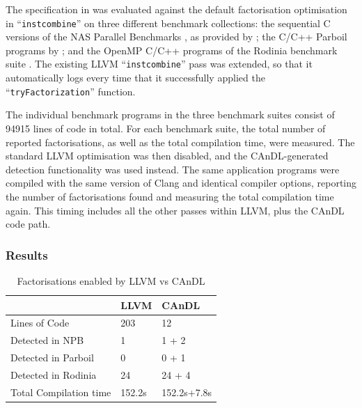     The specification in  was evaluated against the default
    factorisation optimisation in ``{\tt instcombine}'' on three different
    benchmark collections:
    the sequential C versions of the NAS Parallel Benchmarks
    \citep{Bailey1991NPB}, as provided by \citet{seo2011performance};
    the C/C++ Parboil programs by \citet{stratton2012parboil};
    and the OpenMP C/C++ programs of the Rodinia benchmark suite
    \citep{Che2009Rodinia}.
    The existing LLVM ``{\tt instcombine}'' pass was extended, so that it
    automatically logs every time that it successfully applied the
    ``{\tt tryFactorization}'' function.  

    The individual benchmark programs in the three benchmark
    suites consist of 94915 lines of code in total.
    For each benchmark suite, the total number of reported factorisations, as
    well as the total compilation time, were measured.
    The standard LLVM optimisation was then disabled, and the CAnDL-generated
    detection functionality was used instead.
    The same application programs were compiled with the same version of Clang
    and identical compiler options, reporting the number of factorisations
    found and measuring the total compilation time again.
    This timing includes all the other passes within LLVM, plus the CAnDL code
    path.

\subsubsection{Results}

\begin{table}[t]
  \centering
  \begin{tabular}{lll}
    \toprule
    & {\bf LLVM} & {\bf CAnDL} \\
    \midrule
    Lines of Code & 203 & 12 \\
    Detected in NPB & 1 & 1 + 2 \\
    Detected in Parboil & 0 & 0 + 1\\
    Detected in Rodinia & 24 & 24 + 4\\
    Total Compilation time & 152.2s & 152.2s+7.8s \\
    \bottomrule
\end{tabular}
\caption{Factorisations enabled by LLVM vs CAnDL}
\label{fig:factorization_results}
\end{table}

